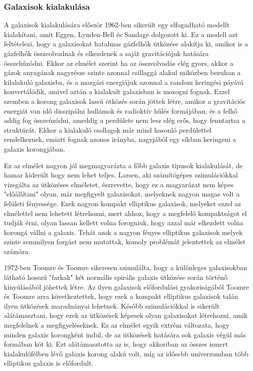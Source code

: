 \documentclass[../main.tex]{subfiles}
\begin{document}
\subsubsection{Galaxisok kialakulása \cite{galaxy_formation}}
A galaxisok kialakulására először 1962-ben sikerült egy elfogadható modellt kialakítani, amit Eggen, Lynden-Bell és Sandage dolgozott ki. Ez a modell azt feltételezi, hogy a galaxisokat hatalmas gázfelhők ütközése alakítja ki,
amikor is a gázfelhők összeolvadnak és elkezdenek a saját gravitációjuk hatására összehúzódni. Ekkor az elmélet szerint ha az összeolvadás elég gyors, akkor a gázok anyagának nagyrésze szinte azonnal csillaggá alakul miközben bezuhan
a kilalakuló galaxisba, és a mozgási energiájuk azonnal a random keringési páyává konvertálódik, amivel aztán a kialakult galaxisban is mozogni fognak. Ezzel szemben a korong galaxisok lassú ötközés során jöttek létre,
amikor a gravitációs energiát van idő disszipálni hullámok és radioktív hűlés formájában, és a felhő addig fog összeúzódni, ameddig a perdülete nem lesz elég erős, hogy fenntartsa a struktúrát. 
Ekkor a kialakuló csollagok már mind hasonló perdülettel rendelkeznek, emiatt fognak azonos irányba, nagyjából egy síkban keringeni a galaxis korongjában.

Ez az elmélet nagyon jól megmagyarázta a főbb galaxis tipusok kialakulását, de hamar kiderült hogy nem lehet teljes. Larsen, aki számítógépes szimulációkkal vizsgálta az ütközéses elméletet, észrevette, hogy
ez a magyarázat nem képes "előállítani" olyan, már megfigyelt galaxisokat, melyeknek nagyon magas volt a felületi fényessége. Ezek nagyon kompakt elliptikus galaxisok, melyeket ezzel az elmélettel nem lehetett létrehozni,
mert ahhoz, hogy a megfelelő kompaktságot el tudják érni, olyan lassan kellett volna forogniuk, hogy azzal már elkezdett volna korongá vállni a galaxis. Tehát azok a nagyon fényes elliptikus galaxisok melyek szinte semmilyen
forgást nem mutattak, komoly problémát jelentettek az elmélet számára.

1972-ben Toomre és Toomre sikeresen szimulálta, hogy a különleges galaxisokban látható hosszú "farkak" két normális spirális galaxis ütközése során történő kinyúlásából jöhettek létre.
Az ilyen galaxisok előfordulási gyakoriságából Toomre és Toomre arra következtettek, hogy ezek a kompakt elliptikus galaxisok talán ilyen ütközések maradnányai lehetnek. Később szimulációkkal is sikerült
alátámasztani, hogy ezek az ütközések képesek olyan galaxisokat létrehozni, amik megfelelnek a megfigyeléseknek. Ez az elmélet egyik extrém változata, hogy minden galaxis korongként indul,
de az ütközések hatására sok galaxis végül más formában köt ki. Ezt alátámasztotta az is, hogy akkoriban az összes ismert kialakulófélben lévő galaxis korong alakú volt, míg az idősebb univerzumban
több elliptikus galaxis is előfordult.
\end{document}
